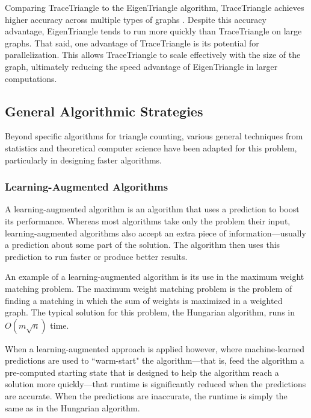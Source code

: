 \documentclass[11pt, margin=1in]{article}
\begin{document}
Comparing TraceTriangle to the EigenTriangle algorithm, TraceTriangle achieves higher accuracy across multiple types of graphs \cite{avron_counting_2010}.
Despite this accuracy advantage, EigenTriangle tends to run more quickly than TraceTriangle on large graphs.
That said, one advantage of TraceTriangle is its potential for parallelization.
This allows TraceTriangle to scale effectively with the size of the graph, ultimately reducing the speed advantage of EigenTriangle in larger computations.

\subsection{General Algorithmic Strategies}

Beyond specific algorithms for triangle counting, various general techniques from statistics and theoretical computer science have been adapted for this problem, particularly in designing faster algorithms.

\subsubsection{Learning-Augmented Algorithms}

A learning-augmented algorithm \cite{roughgarden_algorithms_2020} is an algorithm that uses a prediction to boost its performance.
Whereas most algorithms take only the problem their input, learning-augmented algorithms also accept an extra piece of information—usually a prediction about some part of the solution.
The algorithm then uses this prediction to run faster or produce better results.

An example of a learning-augmented algorithm is its use in the maximum weight matching problem.
The maximum weight matching problem \cite{duan_linear-time_2014} is the problem of finding a matching in which the sum of weights is maximized in a weighted graph.
The typical solution for this problem, the Hungarian algorithm, runs in $O(m\sqrt{n})$ time.

When a learning-augmented approach \cite{dinitz_faster_2021} is applied however, where machine-learned predictions are used to ``warm-start" the algorithm—that is, feed the algorithm a pre-computed starting state that is designed to help the algorithm reach a solution more quickly—that runtime is significantly reduced when the predictions are accurate.
When the predictions are inaccurate, the runtime is simply the same as in the Hungarian algorithm.
\end{document}
